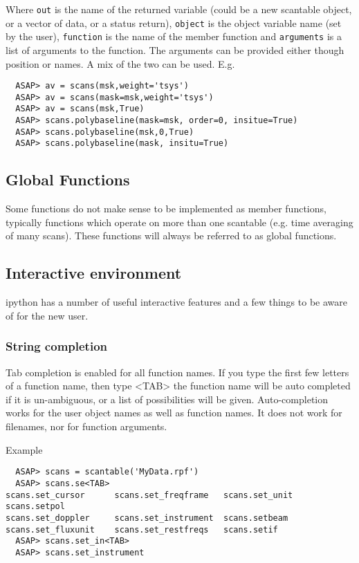 \documentclass[11pt]{article}
\newcommand{\cmd}[1]{{\tt #1}}
\begin{document}
Where \cmd{out} is the name of the returned variable (could be a new
scantable object, or a vector of data, or a status return),  \cmd{object} is the
object variable name (set by the user), \cmd{function} is the name of
the member function and \cmd{arguments} is a list of arguments to the
function. The arguments can be provided either though position or names.
A mix of the two can be used.  E.g. 

\begin{verbatim}
  ASAP> av = scans(msk,weight='tsys')
  ASAP> av = scans(mask=msk,weight='tsys')
  ASAP> av = scans(msk,True)
  ASAP> scans.polybaseline(mask=msk, order=0, insitue=True)
  ASAP> scans.polybaseline(msk,0,True)
  ASAP> scans.polybaseline(mask, insitu=True)
\end{verbatim}

\subsection{Global Functions}

Some functions do not make sense to be implemented as member
functions, typically functions which operate on more than one scantable
(e.g. time averaging of many scans). These functions will always be
referred to as global functions.

\subsection{Interactive environment}

ipython has a number of useful interactive features and a few things to be aware
of for the new user.

\subsubsection{String completion}

Tab completion is enabled for all function names. If you type the
first few letters of a function name, then type <TAB> the function
name will be auto completed if it is un-ambiguous, or a list of
possibilities will be given. Auto-completion works for the user
object names as well as function names. It does not work for filenames,
nor for function arguments.

Example
\begin{verbatim}
  ASAP> scans = scantable('MyData.rpf')
  ASAP> scans.se<TAB>
scans.set_cursor      scans.set_freqframe   scans.set_unit        scans.setpol
scans.set_doppler     scans.set_instrument  scans.setbeam         
scans.set_fluxunit    scans.set_restfreqs   scans.setif     
  ASAP> scans.set_in<TAB>
  ASAP> scans.set_instrument
\end{verbatim}
\end{document}
